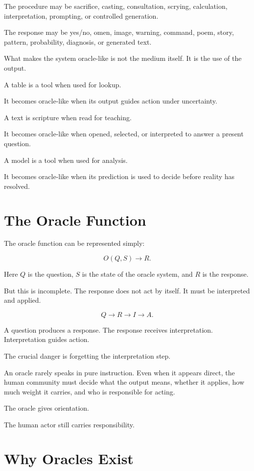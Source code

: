 \documentclass[11pt]{book}
\begin{document}
The procedure may be sacrifice, casting, consultation, scrying, calculation, interpretation, prompting, or controlled generation.

The response may be yes/no, omen, image, warning, command, poem, story, pattern, probability, diagnosis, or generated text.

What makes the system oracle-like is not the medium itself. It is the use of the output.

A table is a tool when used for lookup.

It becomes oracle-like when its output guides action under uncertainty.

A text is scripture when read for teaching.

It becomes oracle-like when opened, selected, or interpreted to answer a present question.

A model is a tool when used for analysis.

It becomes oracle-like when its prediction is used to decide before reality has resolved.

\section{The Oracle Function}

The oracle function can be represented simply:

\[
O(Q,S) \rightarrow R.
\]

Here \(Q\) is the question, \(S\) is the state of the oracle system, and \(R\) is the response.

But this is incomplete. The response does not act by itself. It must be interpreted and applied.

\[
Q
\rightarrow
R
\rightarrow
I
\rightarrow
A.
\]

A question produces a response. The response receives interpretation. Interpretation guides action.

The crucial danger is forgetting the interpretation step.

An oracle rarely speaks in pure instruction. Even when it appears direct, the human community must decide what the output means, whether it applies, how much weight it carries, and who is responsible for acting.

The oracle gives orientation.

The human actor still carries responsibility.

\section{Why Oracles Exist}
\end{document}
